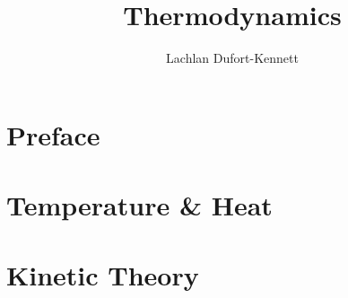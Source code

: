 \documentclass[12pt]{report}
\title{Thermodynamics}
\author{Lachlan Dufort-Kennett}
\theoremstyle{theorem}
\theoremstyle{def}
\begin{document}
    \maketitle
    \setcounter{tocdepth}{1}
    \tableofcontents

    \chapter*{Preface}

    \chapter{Temperature \& Heat}
    
    \chapter{Kinetic Theory}
    

    \nocite{*}
    
    
\end{document}

